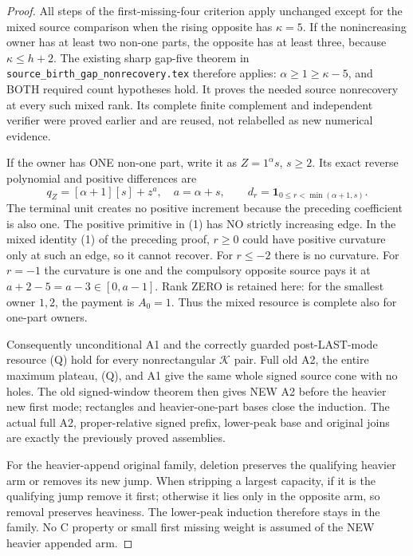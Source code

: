 \begin{proof}
All steps of the first-missing-four criterion apply unchanged except
for the mixed source comparison when the rising opposite has
$\kappa=5$. If the nonincreasing owner has at least two non-one
parts, the opposite has at least three, because $\kappa\le h+2$.
The existing sharp gap-five theorem in
\texttt{source\_birth\_gap\_nonrecovery.tex} therefore applies:
$\alpha\ge1\ge\kappa-5$, and BOTH required count hypotheses hold.
It proves the needed source nonrecovery at every such mixed rank.
Its complete finite complement and independent verifier were proved
earlier and are reused, not relabelled as new numerical evidence.

If the owner has ONE non-one part, write it as $Z=1^\alpha s$,
$s\ge2$. Its exact reverse polynomial and positive differences are
\[
 q_Z=[\alpha+1][s]+z^{a},\quad a=\alpha+s,\qquad
 d_r=\mathbf1_{0\le r<\min(\alpha+1,s)}.       \tag{1}
\]
The terminal unit creates no positive increment because the preceding
coefficient is also one. The positive primitive in (1) has NO strictly
increasing edge. In the mixed identity (1) of the preceding proof,
$r\ge0$ could have positive curvature only at such an edge, so it
cannot recover. For $r\le-2$ there is no curvature. For $r=-1$ the
curvature is one and the compulsory opposite source pays it at
$a+2-5=a-3\in[0,a-1]$. Rank ZERO is retained here: for the smallest
owner $1,2$, the payment is $A_0=1$. Thus the mixed resource is
complete also for one-part owners.

Consequently unconditional A1 and the correctly guarded post-LAST-mode
resource (Q) hold for every nonrectangular $\mathcal K$ pair.
Full old A2, the entire maximum plateau, (Q), and A1 give the same
whole signed source cone with no holes. The old signed-window theorem
then gives NEW A2 before the heavier new first mode; rectangles and
heavier-one-part bases close the induction. The actual full A2,
proper-relative signed prefix, lower-peak base and original joins are
exactly the previously proved assemblies.

For the heavier-append original family, deletion preserves the
qualifying heavier arm or removes its new jump. When stripping a
largest capacity, if it is the qualifying jump remove it first;
otherwise it lies only in the opposite arm, so removal preserves
heaviness. The lower-peak induction therefore stays in the family.
No C property or small first missing weight is assumed of the NEW
heavier appended arm.
\end{proof}

